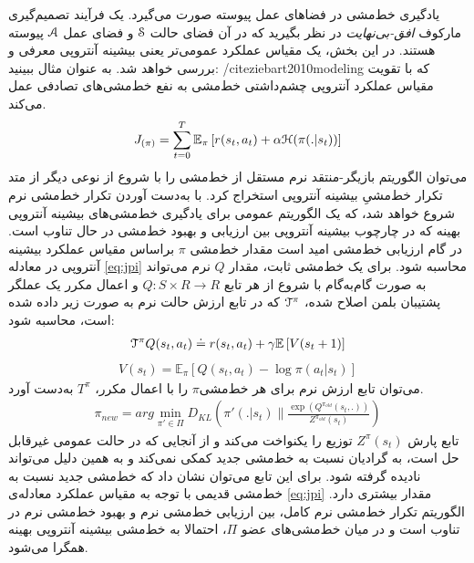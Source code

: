 یادگیری خط‌مشی در فضاهای عمل پیوسته صورت می‌گیرد. یک فرآیند تصمیم‌گیری مارکوف 
\textit{افق-بی‌نهایت}
 در نظر بگیرید که در آن فضای حالت
$\EuScript{S}$
   و فضای عمل
   $\EuScript{A}$
    پیوسته هستند.
در این بخش، یک مقیاس عملکرد عمومی‌تر یعنی بیشینه آنتروپی معرفی و بررسی خواهد شد.
به عنوان مثال ببینید: 
/cite{ziebart2010modeling}
که با تقویت مقیاس عملکرد آنتروپی چشم‌داشتی خط‌مشی به نفع خط‌مشی‌های تصادفی عمل می‌کند.
\begin{align}
J_{(\pi)}= \sum\limits_{t=0}^T \mathbb{E}_\pi \left[ r(s_t , a_t) + \alpha \EuScript{H} (\pi(.|s_t)) \right]
\label{eq:jpi}
\end{align}
می‌توان الگوریتم بازیگر-منتقد نرم مستقل از خط‌مشی را با شروع از نوعی دیگر از متد تکرار خط‌مشیِ بیشینه آنتروپی استخراج کرد.
با به‌دست آوردن تکرار خط‌مشی نرم شروع خواهد شد، که یک الگوریتم عمومی برای یادگیری خط‌مشی‌های بیشینه آنتروپی بهینه که در چارچوب بیشینه آنتروپی بین ارزیابی و بهبود خط‌مشی در حال تناوب است.
در گام ارزیابی خط‌مشی امید است مقدار خط‌مشی
$\pi$
 براساس مقیاس عملکرد بیشینه آنتروپی در معادله \ref{eq:jpi} محاسبه شود. برای یک خط‌مشی ثابت، مقدار $Q$  نرم می‌تواند به صورت گام‌به‌گام با شروع از هر تابع
  $Q:S \times R \rightarrow R$ 
 و اعمال مکرر یک عملگر پشتیبان بلمن اصلاح شده،
 $\EuScript{T}^\pi$
  که در تابع ارزش حالت نرم به صورت زیر داده شده است، محاسبه شود:
\begin{align}
\EuScript{T}^\pi Q(s_t,a_t) \doteq r(s_t,a_t)+\gamma \mathbb{E} \left[ V(s_t+1) \right]
\label{eq:tpi}
\end{align}
\begin{align}
V(s_t)= \mathbb{E}_\pi \left[ Q(s_t,a_t)- \log \pi(a_t | s_t) \right]
\end{align}
می‌توان تابع ارزش نرم برای هر خط‌مشی$\pi$ را با اعمال مکرر، $T^\pi$ به‌دست آورد.
\begin{align}
\pi_{new} = arg \min_{\pi' \in \Pi} D_{KL}  \left( \pi'(.|s_t) \parallel \frac{\exp{(Q^{\pi_{old}} (s_t,.))}}{Z^{\pi_{old}} (s_t)}\right)
\label{eq:pinew}
\end{align}
تابع پارش 
$Z^\pi (s_t)$
توزیع را یکنواخت می‌کند و از آنجایی که در حالت عمومی غیرقابل حل است، به گرادیان نسبت به خط‌مشی جدید کمکی نمی‌کند و به همین دلیل می‌تواند نادیده گرفته شود. برای این تابع می‌توان نشان داد که خط‌مشی جدید نسبت به خط‌مشی قدیمی با توجه به مقیاس عملکرد معادله‌ی \ref{eq:jpi} مقدار بیشتری دارد. 
الگوریتم تکرار خط‌مشی نرم کامل، بین ارزیابی خط‌مشی نرم و بهبود خط‌مشی نرم در تناوب است و در میان خط‌مشی‌های عضو
$\Pi$،
احتمالا به خط‌مشی بیشینه آنتروپی بهینه همگرا می‌شود.
